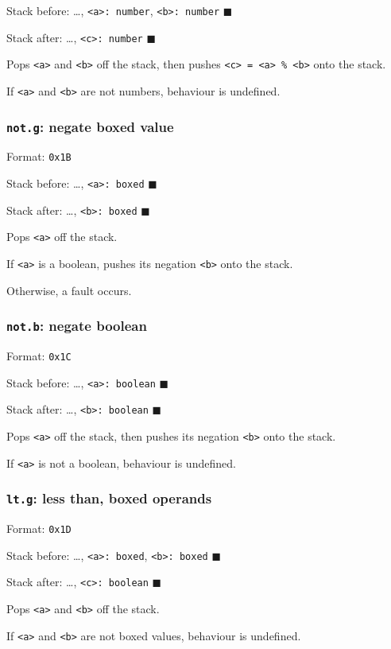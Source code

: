 Stack before: \ldots{}, \texttt{<a>: number}, \texttt{<b>: number} \(\blacksquare\)

Stack after: \ldots{}, \texttt{<c>: number} \(\blacksquare\)

Pops \texttt{<a>} and \texttt{<b>} off the stack, then pushes \texttt{<c> = <a> \% <b>} onto
the stack.

If \texttt{<a>} and \texttt{<b>} are not numbers, behaviour is undefined.

\subsubsection{\texttt{not.g}: negate boxed value}
\label{sec:org4404772}
Format: \texttt{0x1B}

Stack before: \ldots{}, \texttt{<a>: boxed} \(\blacksquare\)

Stack after: \ldots{}, \texttt{<b>: boxed} \(\blacksquare\)

Pops \texttt{<a>} off the stack.

If \texttt{<a>} is a boolean, pushes its negation \texttt{<b>} onto the stack.

Otherwise, a fault occurs.

\subsubsection{\texttt{not.b}: negate boolean}
\label{sec:org446322c}
Format: \texttt{0x1C}

Stack before: \ldots{}, \texttt{<a>: boolean} \(\blacksquare\)

Stack after: \ldots{}, \texttt{<b>: boolean} \(\blacksquare\)

Pops \texttt{<a>} off the stack, then pushes its negation \texttt{<b>} onto the stack.

If \texttt{<a>} is not a boolean, behaviour is undefined.

\subsubsection{\texttt{lt.g}: less than, boxed operands}
\label{sec:org5479aa3}
Format: \texttt{0x1D}

Stack before: \ldots{}, \texttt{<a>: boxed}, \texttt{<b>: boxed} \(\blacksquare\)

Stack after: \ldots{}, \texttt{<c>: boolean} \(\blacksquare\)

Pops \texttt{<a>} and \texttt{<b>} off the stack.

If \texttt{<a>} and \texttt{<b>} are not boxed values, behaviour is undefined.

